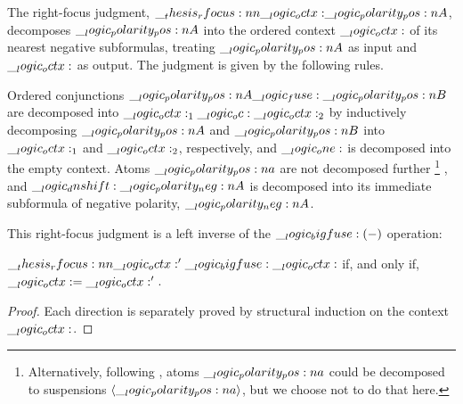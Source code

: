 The right-focus judgment, $\__thesis_rfocus:nn {\__logic_octx:} {\__logic_polarity_pos:n {A}}$, decomposes $\__logic_polarity_pos:n {A}$ into the ordered context $\__logic_octx:$ of its nearest negative subformulas, treating $\__logic_polarity_pos:n {A}$ as input and $\__logic_octx:$ as output.
The judgment is given by the following rules.
Ordered conjunctions $\__logic_polarity_pos:n {A} \__logic_fuse: \__logic_polarity_pos:n {B}$ are decomposed into $\__logic_octx:_1 \__logic_oc: \__logic_octx:_2$ by inductively decomposing $\__logic_polarity_pos:n {A}$ and $\__logic_polarity_pos:n {B}$ into $\__logic_octx:_1$ and $\__logic_octx:_2$, respectively, and $\__logic_one:$ is decomposed into the empty context.
Atoms $\__logic_polarity_pos:n {a}$ are not decomposed further%
\footnote{Alternatively, following \textcite{Simmons:CMU12}, atoms $\__logic_polarity_pos:n {a}$ could be decomposed to suspensions $\langle\__logic_polarity_pos:n {a}\rangle$, but we choose not to do that here.}%
, and $\__logic_dnshift: \__logic_polarity_neg:n {A}$ is decomposed into its immediate subformula of negative polarity, $\__logic_polarity_neg:n {A}$.

This right-focus judgment is a left inverse of the $\__logic_bigfuse: (-)$ operation:
\begin{lemma}
  $\__thesis_rfocus:nn {\__logic_octx:'{}} {\__logic_bigfuse: \__logic_octx:}$ if, and only if, $\__logic_octx: = \__logic_octx:'{}$.
\end{lemma}
\begin{proof}
  Each direction is separately proved by structural induction on the context $\__logic_octx:$.
\end{proof}


